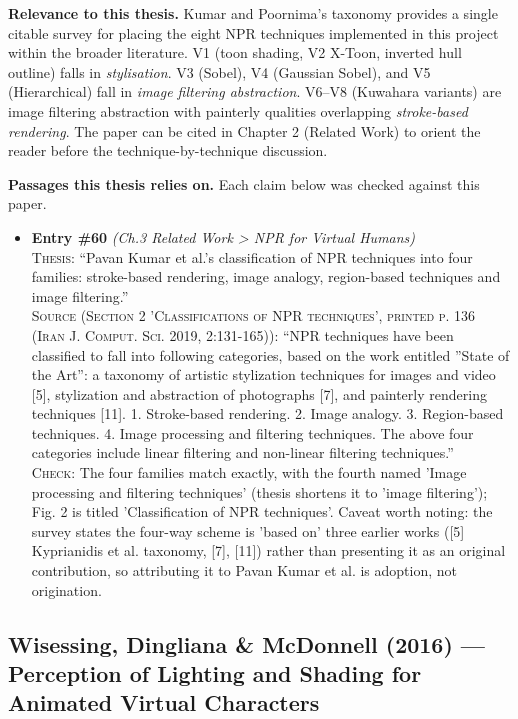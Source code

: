 \documentclass[11pt, a4paper]{article}
\begin{document}
\textbf{Relevance to this thesis.} Kumar and Poornima's taxonomy provides a single citable survey for placing the eight NPR techniques implemented in this project within the broader literature. V1 (toon shading, V2 X-Toon, inverted hull outline) falls in \textit{stylisation}. V3 (Sobel), V4 (Gaussian Sobel), and V5 (Hierarchical) fall in \textit{image filtering abstraction}. V6--V8 (Kuwahara variants) are image filtering abstraction with painterly qualities overlapping \textit{stroke-based rendering}. The paper can be cited in Chapter 2 (Related Work) to orient the reader before the technique-by-technique discussion.


\textbf{Passages this thesis relies on.} Each claim below was checked against this paper.
\begin{itemize}[leftmargin=1.2em,itemsep=4pt]
\item \textbf{Entry \#60} \textit{(Ch.3 Related Work > NPR for Virtual Humans)}\\
\textsc{Thesis:} ``Pavan Kumar et al.'s classification of NPR techniques into four families: stroke-based rendering, image analogy, region-based techniques and image filtering.''\\
\textsc{Source (Section 2 'Classifications of NPR techniques', printed p. 136 (Iran J. Comput. Sci. 2019, 2:131-165)):} ``NPR techniques have been classified to fall into following categories, based on the work entitled ”State of the Art”: a taxonomy of artistic stylization techniques for images and video [5], stylization and abstraction of photographs [7], and painterly rendering techniques [11]. 1. Stroke-based rendering. 2. Image analogy. 3. Region-based techniques. 4. Image processing and filtering techniques. The above four categories include linear filtering and non-linear filtering techniques.''\\
\textsc{Check:} The four families match exactly, with the fourth named 'Image processing and filtering techniques' (thesis shortens it to 'image filtering'); Fig. 2 is titled 'Classification of NPR techniques'. Caveat worth noting: the survey states the four-way scheme is 'based on' three earlier works ([5] Kyprianidis et al. taxonomy, [7], [11]) rather than presenting it as an original contribution, so attributing it to Pavan Kumar et al. is adoption, not origination.
\end{itemize}

\vspace{8pt}
\subsection{Wisessing, Dingliana \& McDonnell (2016) --- Perception of Lighting and Shading for Animated Virtual Characters}
\end{document}
